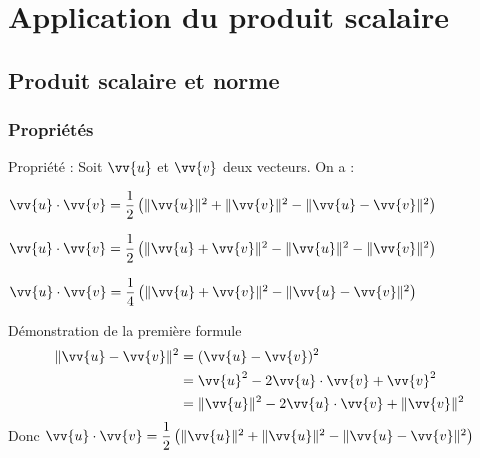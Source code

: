 \chapter{Application du produit scalaire}
\thispagestyle{fancy}

    \section{Produit scalaire et norme}
    
    \subsection{Propriétés}

    
    \begin{bprop}
        Propriété : Soit $\vv{u}$ et $\vv{v}$ deux vecteurs. On a :
        \begin{itemDef}
            \item $\vv{u} \cdot \vv{v}=\dfrac{1}{2}\left(\|\vv{u}\|^{2}+\|\vv{v}\|^{2}-\|\vv{u}-\vv{v}\|^{2}\right)$
            \item $\vv{u} \cdot \vv{v}=\dfrac{1}{2}\left(\|\vv{u}+\vv{v}\|^{2}-\|\vv{u}\|^{2}-\|\vv{v}\|^{2}\right)$
            \item $\vv{u} \cdot \vv{v}=\dfrac{1}{4}\left(\|\vv{u}+\vv{v}\|^{2}-\|\vv{u}-\vv{v}\|^{2}\right)$
        \end{itemDef}
    \end{bprop}
    
    \begin{bdemot}{Démonstration de la première formule}
        \begin{align*}
            \|\vv{u}-\vv{v}\|^{2}&=(\vv{u}-\vv{v})^{2} \\
            &=\vv{u}^{2}-2 \vv{u} \cdot \vv{v}+\vv{v}^{2} \\
            &=\|\vv{u}\|^{2}-2 \vv{u} \cdot \vv{v}+\|\vv{v}\|^{2}
        \end{align*}
        Donc $\vv{u} \cdot \vv{v}=\dfrac{1}{2}\left(\|\vv{u}\|^{2}+\|\vv{u}\|^{2}-\|\vv{u}-\vv{v}\|^{2}\right)$
    \end{bdemot}

